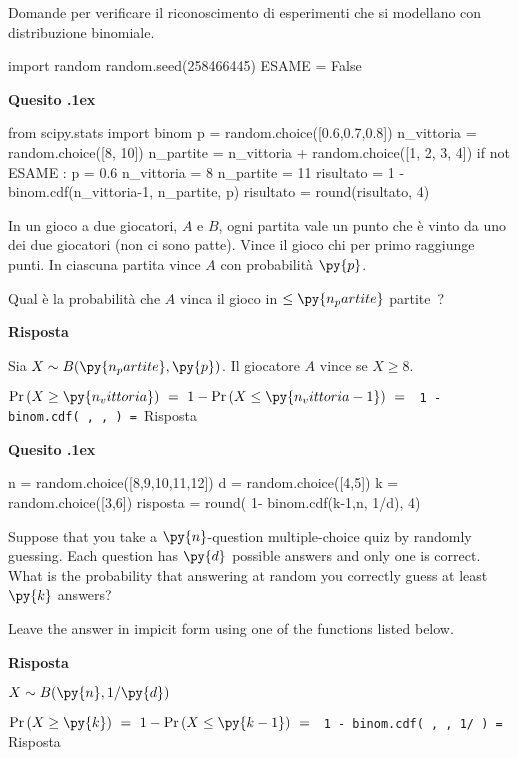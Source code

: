 \documentclass[11pt,twoside,a4paper]{article}
\newcounter{quesito}
\newenvironment{question}{\bigskip\addtocounter{quesito}{1}\bigskip\bigskip\par\textbf{Quesito \thequesito.\kern1ex}}{\vspace{\parskip}}
\newenvironment{answer}{\par\textbf{Risposta\quad}}{\vspace{\parskip}}
\begin{document}
\colorbox{blue!10}{\begin{minipage}{\textwidth}
Domande  per verificare il riconoscimento di esperimenti che si modellano con distribuzione binomiale.
\end{minipage}}

\bigskip\bigskip


\begin{pycode}
import random
random.seed(258466445)
ESAME = False
\end{pycode}


\begin{question}
\def\Pr{{\rm Pr\,}}
\def\Ex{{\rm E\,}}
\def\Var{{\rm Var\,}}
\begin{pycode}
from scipy.stats import binom
p = random.choice([0.6,0.7,0.8])
n_vittoria = random.choice([8, 10])
n_partite = n_vittoria + random.choice([1, 2, 3, 4])
if not ESAME :
   p = 0.6
   n_vittoria = 8
   n_partite = 11
risultato = 1 - binom.cdf(n_vittoria-1, n_partite, p)
risultato = round(risultato, 4)
\end{pycode}
In un gioco a due giocatori, $A$ e $B$, ogni partita vale un punto che è vinto da uno dei due giocatori (non ci sono patte). Vince il gioco chi per primo raggiunge  punti. In ciascuna partita vince $A$ con probabilità $\py{p}$.

Qual è la probabilità che $A$ vinca il gioco in $\le\py{n_partite}$ partite~?
\begin{answer}

Sia $X\sim B(\py{n_partite},\py{p})$. Il giocatore $A$ vince se $X\ge 8$. 

$\displaystyle\Pr(X\ge\py{n_vittoria})\ =\ 1-\Pr( X\le\py{n_vittoria-1} )\ =\ ${\tt{\color{blue} 1 - binom.cdf( , ,  ) }=  }{\color{blue}\hfill Risposta}
\end{answer}
\end{question}



\begin{question}
\begin{pycode}
n = random.choice([8,9,10,11,12])
d = random.choice([4,5])
k = random.choice([3,6])
risposta = round( 1- binom.cdf(k-1,n, 1/d), 4)
\end{pycode}
Suppose that you take a $\py{n}$-question multiple-choice quiz by randomly guessing. Each question has $\py{d}$ possible answers and only one is correct. What is the probability that answering at random you correctly guess at least $\py{k}$ answers? 

Leave the answer in impicit form using one of the functions listed below.
\begin{answer}

$X\sim B(\py{n}, 1/\py{d})$

$\Pr(X\ge\py{k})\ =\ 1-\Pr(X\le \py{k-1})\ =\ ${\tt{\color{blue}  1 - binom.cdf( , , 1/ )} = }{\color{blue}\hfill Risposta}

\end{answer}
\end{question}
\end{document}
